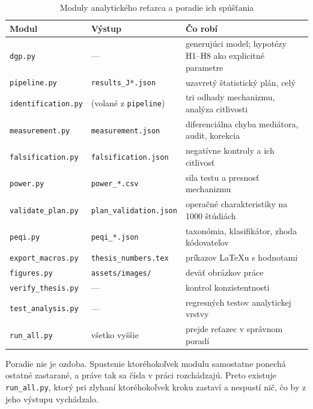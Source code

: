 \begin{table}[H]
\centering
\caption{Moduly analytického reťazca a poradie ich spúšťania}
\label{tab:moduly}
\small
\begin{tabularx}{\textwidth}{@{}l l X@{}}
\toprule
\textbf{Modul} & \textbf{Výstup} & \textbf{Čo robí} \\
\midrule
\texttt{dgp.py} & --- & generujúci model; hypotézy H1--H8 ako explicitné parametre \\
\texttt{pipeline.py} & \texttt{results\_J*.json} & uzavretý štatistický plán, celý \\
\texttt{identification.py} & (volané z \texttt{pipeline}) & tri odhady mechanizmu, analýza citlivosti \\
\texttt{measurement.py} & \texttt{measurement.json} & diferenciálna chyba mediátora, audit, korekcia \\
\texttt{falsification.py} & \texttt{falsification.json} & negatívne kontroly a ich citlivosť \\
\texttt{power.py} & \texttt{power\_*.csv} & sila testu a presnosť mechanizmu \\
\texttt{validate\_plan.py} & \texttt{plan\_validation.json} & operačné charakteristiky na 1000 štúdiách \\
\texttt{peqi.py} & \texttt{peqi\_*.json} & taxonómia, klasifikátor, zhoda kódovateľov \\
\texttt{export\_macros.py} & \texttt{thesis\_numbers.tex} & \repoMacros{} príkazov \LaTeX{}u s hodnotami \\
\texttt{figures.py} & \texttt{assets/images/} & deväť obrázkov práce \\
\texttt{verify\_thesis.py} & --- & \repoChecks{} kontrol konzistentnosti \\
\texttt{test\_analysis.py} & --- & \repoTestsAnalysis{} regresných testov analytickej vrstvy \\
\midrule
\texttt{run\_all.py} & všetko vyššie & prejde reťazec v správnom poradí \\
\bottomrule
\end{tabularx}
\end{table}

Poradie nie je ozdoba. Spustenie ktoréhokoľvek modulu samostatne ponechá ostatné zastarané, a práve tak sa čísla v práci rozchádzajú. Preto existuje \texttt{run\_all.py}, ktorý pri zlyhaní ktoréhokoľvek kroku zastaví a nespustí nič, čo by z jeho výstupu vychádzalo.

